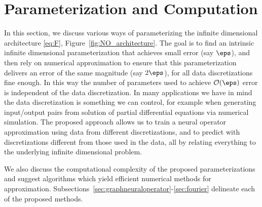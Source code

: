 \section{Parameterization and Computation}
\label{sec:four_schemes}
In this section, we discuss various ways of parameterizing the infinite dimensional architecture \eqref{eq:F}, Figure~\ref{fig:NO_architecture}. The goal is to find
an intrinsic infinite dimensional parameterization that achieves
small error (say $\eps$), and then rely on numerical approximation to ensure that this parameterization  delivers an error of the same
magnitude (say $2\eps$), for all
data discretizations fine enough. In this way the number of parameters used to achieve ${\mathcal O}(\eps)$ error is independent of the data discretization. In many applications we have in mind the data
discretization is something we can control, for example when
generating input/output pairs from solution of partial
differential equations via numerical simulation. The proposed
approach allows us to train a neural operator approximation
using data from different discretizations, and to predict with
discretizations different from those used in the data, all by
relating everything to the underlying infinite dimensional
problem.


We also discuss the computational complexity of the proposed parameterizations and suggest algorithms which yield efficient numerical methods for approximation. Subsections~\ref{sec:graphneuraloperator}-\ref{sec:fourier} delineate each of the proposed methods.

